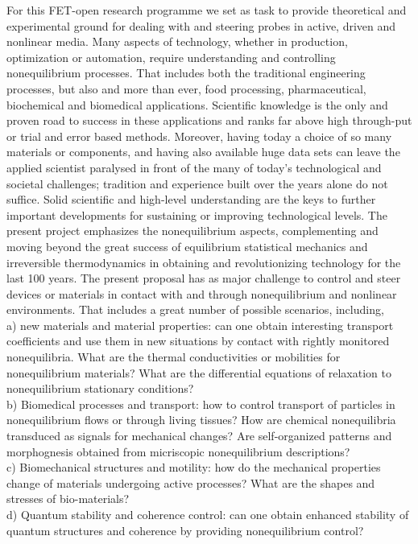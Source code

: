 For this FET-open research programme we set as task to provide theoretical and experimental
ground for dealing with and steering probes in active, driven and nonlinear media.  Many
aspects of technology, whether in production, optimization or automation, require
understanding and controlling nonequilibrium processes.  That includes both the traditional
engineering processes, but also and more than ever, food processing, pharmaceutical,
biochemical and biomedical applications.  Scientific knowledge is the only and proven road
to success in these applications and ranks far above high through-put or trial and error
based methods.  Moreover, having today a choice of so many materials or components, and
having also available huge data sets can leave the applied scientist paralysed in front of
the many of today's technological and societal challenges; tradition and experience built
over the years alone do not suffice.  Solid scientific and high-level understanding are the
keys to further important developments for sustaining or improving technological levels.
The present project emphasizes the nonequilibrium aspects, complementing and moving beyond
the great success of equilibrium statistical mechanics and irreversible thermodynamics in
obtaining and revolutionizing technology for the last 100 years.
The present proposal has as major challenge to control and steer devices or materials in contact with and through nonequilibrium and nonlinear environments.  That includes a great number of possible scenarios, including,\\
a) new materials and material properties:  can one obtain interesting transport coefficients and use them in new situations by contact with rightly monitored nonequilibria.  What are the thermal conductivities or mobilities for nonequilibrium materials?  What are the differential equations of relaxation to nonequilibrium stationary conditions?\\
b) Biomedical processes and transport: how to control transport of particles in nonequilibrium flows or through living tissues?  How are chemical nonequilibria transduced as signals for mechanical changes? Are self-organized patterns and morphognesis obtained from micriscopic nonequilibrium descriptions?\\
c) Biomechanical structures and motility: how do the mechanical properties change of materials undergoing active processes?  What are the shapes and stresses of bio-materials?\\
d) Quantum stability and coherence control: can one obtain enhanced stability of quantum structures and coherence by providing nonequilibrium control?\\
